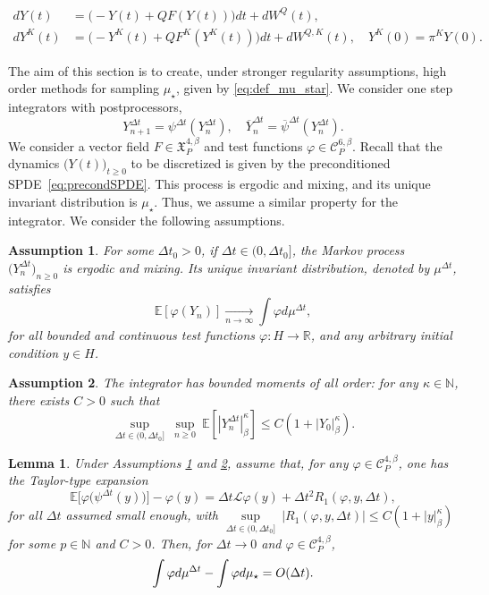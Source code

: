 \documentclass[10pt,a4paper]{amsart}
\newtheorem{ass}{Assumption}
\newtheorem{lemma}{Lemma}
\newcommand{\E}{\mathbb{E}}
\newcommand{\N}{\mathbb{N}}
\newcommand{\R}{\mathbb{R}}
\begin{document}
\begin{align}
\label{eq:precondSPDE}
dY(t)&=\big(-Y(t)+QF(Y(t))\big)dt+dW^{Q}(t),\\
\label{eq:precondSPDE_K}
dY^K(t)&=\big(-Y^K(t)+QF^K(Y^K(t))\big)dt+dW^{Q,K}(t),\quad
Y^K(0)=\pi^K Y(0).
\end{align}

The aim of this section is to create, under stronger regularity assumptions, high order methods for sampling $\mu_\star$, given by \eqref{eq:def_mu_star}.
We consider one step integrators with postprocessors,
\[
Y_{n+1}^{\Delta t}=\psi^{\Delta t}(Y_n^{\Delta t}),
\quad
\overline{Y}_n^{\Delta t}=\overline{\psi}^{\Delta t}(Y_n^{\Delta t}).
\]
%
We consider a vector field $F\in \mathfrak{X}^{4,\beta}_P$ and test functions $\varphi\in\mathcal{C}^{6,\beta}_P$.
%
Recall that the dynamics $\bigl(Y(t)\bigr)_{t\ge 0}$ to be discretized is given by the preconditioned SPDE~\eqref{eq:precondSPDE}. This process is ergodic and mixing, and its unique invariant distribution is $\mu_\star$.
Thus, we assume a similar property for the integrator.
We consider the following assumptions.
\begin{ass}
\label{ass:ergodic_num}
For some $\Delta t_0>0$, if $\Delta t\in(0,\Delta t_0]$, the Markov process $\bigl(Y_n^{\Delta t}\bigr)_{n\ge 0}$ is ergodic and mixing. Its unique invariant distribution, denoted by $\mu^{\Delta t}$, satisfies
\[
\E[\varphi(Y_n)]\underset{n\to\infty}\to \int \varphi d\mu^{\Delta t},
\]
for all bounded and continuous test functions $\varphi:H\to \R$, and any arbitrary initial condition $y\in H$.
\end{ass}

\begin{ass}
\label{ass:bounded_mom}
The integrator has bounded moments of all order: for any $\kappa\in\N$, there exists $C>0$ such that
\[
\underset{\Delta t\in(0,\Delta t_0]}\sup~\underset{n\ge 0}\sup~\E[|Y_n^{\Delta t}|_\beta^\kappa]\le C(1+|Y_0|_\beta^\kappa).
\]
\end{ass}

\begin{lemma}\label{lem:order1}
Under Assumptions \ref{ass:ergodic_num} and \ref{ass:bounded_mom}, assume that, for any $\varphi\in\mathcal{C}^{4,\beta}_P$, one has the Taylor-type expansion
\[
\E\bigl[\varphi\bigl(\psi^{\Delta t}(y)\bigr)\bigr]-\varphi(y)=\Delta t\mathcal{L}\varphi(y)+\Delta t^2R_1(\varphi,y,\Delta t),
\]
for all $\Delta t$ assumed small enough,
with $\underset{\Delta t\in(0,\Delta t_0]}\sup~|R_1(\varphi,y,\Delta t)|\le C(1+|y|_\beta^\kappa)$ for some $p\in\N$ and $C>0$.
%
Then, for $\Delta t \rightarrow 0$ and $\varphi\in\mathcal{C}^{4,\beta}_P$,
\begin{equation}\label{eq:expansion_order1}
\int\varphi d\mu^{\Delta t}-\int\varphi d\mu_\star={\rm O}(\Delta t).
\end{equation}
\end{lemma}
\end{document}
